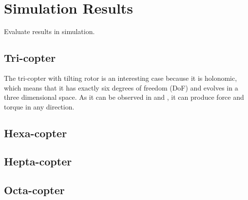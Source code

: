 \chapter{Simulation Results}
\label{sec:simulation_results}
Evaluate results in simulation.

\section{Tri-copter}
\label{sec:tri_copter_sim}

The tri-copter with tilting rotor is an interesting case because it is holonomic,
which means that it has exactly six degrees of freedom (DoF) and evolves in a
three dimensional space. As it can be observed in 
and , it can produce force and torque in any direction.

\section{Hexa-copter}
\label{sec:hexa_copter_sim}

\section{Hepta-copter}
\label{sec:hepta_copter_sim}

\section{Octa-copter}
\label{sec:octa_copter_sim}
